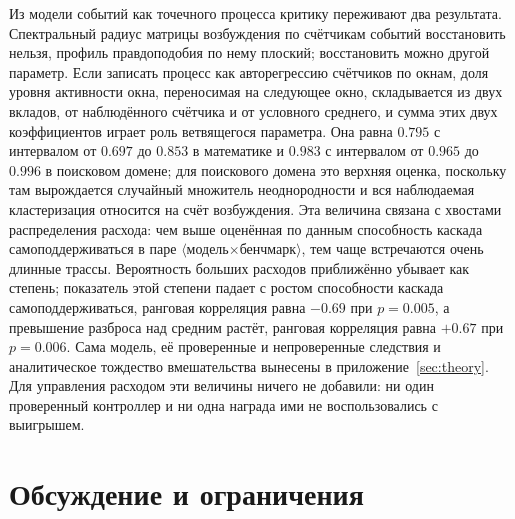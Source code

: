 \documentclass[11pt]{article}
\begin{document}
Из модели событий как точечного процесса критику переживают два результата. Спектральный радиус матрицы возбуждения по счётчикам событий восстановить нельзя, профиль правдоподобия по нему плоский; восстановить можно другой параметр. Если записать процесс как авторегрессию счётчиков по окнам, доля уровня активности окна, переносимая на следующее окно, складывается из двух вкладов, от наблюдённого счётчика и от условного среднего, и сумма этих двух коэффициентов играет роль ветвящегося параметра. Она равна $0.795$ с интервалом от $0.697$ до $0.853$ в математике и $0.983$ с интервалом от $0.965$ до $0.996$ в поисковом домене; для поискового домена это верхняя оценка, поскольку там вырождается случайный множитель неоднородности и вся наблюдаемая кластеризация относится на счёт возбуждения. Эта величина связана с хвостами распределения расхода: чем выше оценённая по данным способность каскада самоподдерживаться в паре $\langle$модель$\times$бенчмарк$\rangle$, тем чаще встречаются очень длинные трассы. Вероятность больших расходов приближённо убывает как степень; показатель этой степени падает с ростом способности каскада самоподдерживаться, ранговая корреляция равна $-0.69$ при $p=0.005$, а превышение разброса над средним растёт, ранговая корреляция равна $+0.67$ при $p=0.006$. Сама модель, её проверенные и непроверенные следствия и аналитическое тождество вмешательства вынесены в приложение~\ref{sec:theory}. Для управления расходом эти величины ничего не добавили: ни один проверенный контроллер и ни одна награда ими не воспользовались с выигрышем.

\section{Обсуждение и ограничения}
\end{document}
